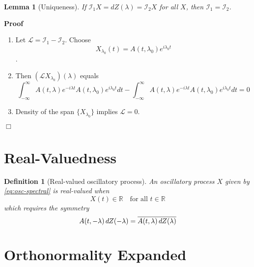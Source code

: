 \documentclass{article}
\newenvironment{proof}{\noindent\textbf{Proof\ }}{\hspace*{\fill}$\Box$\medskip}
\newtheorem{definition}{Definition}
\newtheorem{lemma}{Lemma}
\begin{document}
\begin{lemma}
  [Uniqueness]\label{lem:unique} If $\mathcal{I}_1 X = dZ (\lambda)
  =\mathcal{I}_2 X$ for all $X$, then $\mathcal{I}_1 =\mathcal{I}_2$.
\end{lemma}

\begin{proof}
  \begin{enumerate}
    \item Let $\mathcal{L}=\mathcal{I}_1 -\mathcal{I}_2$. Choose
    \begin{equation}
      X_{\lambda_0} (t) = A (t, \lambda_0) e^{i \lambda_0 t}
    \end{equation}
    .
    
    \item Then $(\mathcal{L}X_{\lambda_0}) (\lambda)$ equals
    \begin{equation}
      \int_{- \infty}^{\infty} A (t, \lambda) e^{- i \lambda t} A (t,
      \lambda_0) e^{i \lambda_0 t} dt - \int_{- \infty}^{\infty} A (t,
      \lambda) e^{- i \lambda t} A (t, \lambda_0) e^{i \lambda_0 t} dt = 0
    \end{equation}
    \item Density of the span $\{X_{\lambda_0} \}$ implies $\mathcal{L}= 0$.
  \end{enumerate}
  
\end{proof}

\section{Real-Valuedness}

\begin{definition}
  [Real-valued oscillatory process]\label{def:real} An oscillatory process $X$
  given by \eqref{eq:osc-spectral} is real-valued when
  \begin{equation}
    \label{eq:real-cond} X (t) \in \mathbb{R} \quad \text{for all } t \in
    \mathbb{R}
  \end{equation}
  which requires the symmetry
  \begin{equation}
    \label{eq:hermitian} A (t, - \lambda)  \hspace{0.17em} dZ (- \lambda) =
    \overline{A (t, \lambda)  \hspace{0.17em} dZ (\lambda)}
  \end{equation}
\end{definition}

\section{Orthonormality Expanded}
\end{document}
